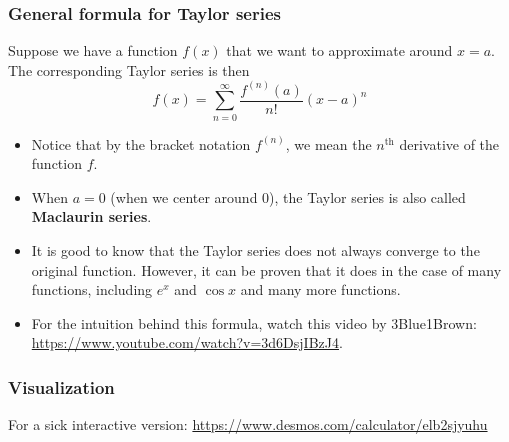 \begin{frame}
\frametitle{General formula for Taylor series}

Suppose we have a function $f(x)$ that we want to approximate around $x=a$. The corresponding Taylor series is then
\[\boxed{f(x)=\sum_{n=0}^\infty \frac{f^{(n)}(a)}{n!}(x-a)^n}\]
\begin{itemize}
\pause\item Notice that by the bracket notation $f^{(n)}$, we mean the $n^\text{th}$ derivative of the function $f$.
\pause\item When $a=0$ (when we center around 0), the Taylor series is also called \textbf{Maclaurin series}.

\pause\item {\footnotesize It is good to know that the Taylor series does not always converge to the original function. However, it can be proven that it does in the case of many functions, including $e^x$ and $\cos x$ and many more functions.}

\pause\item 
{\scriptsize	 For the intuition behind this formula, watch this video by 3Blue1Brown: \url{https://www.youtube.com/watch?v=3d6DsjIBzJ4}.}


\end{itemize}
\end{frame}

\begin{frame}
\frametitle{Visualization}

{ For a sick interactive version: \url{https://www.desmos.com/calculator/elb2sjyuhu}}
\end{frame}

